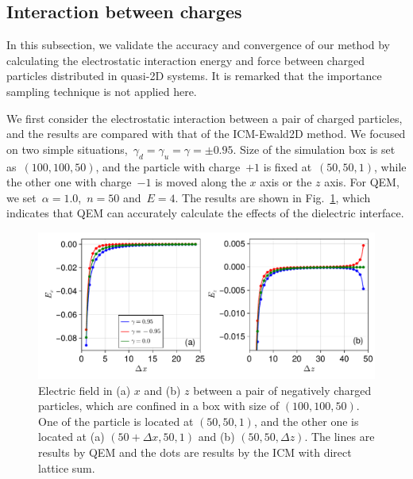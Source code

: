 
\subsection{Interaction between charges}

In this subsection, we validate the accuracy and convergence of our method by calculating the electrostatic interaction energy and force between charged particles distributed in quasi-2D systems.
It is remarked that the importance sampling technique is not applied here.

We first consider the electrostatic interaction between a pair of charged particles, and the results are compared with that of the ICM-Ewald2D method.
We focused on two simple situations,~$\gamma_{d} = \gamma_{u} = \gamma = \pm 0.95$.
Size of the simulation box is set as~$(100, 100, 50)$, and the particle with charge~$+1$ is fixed at~$(50, 50, 1)$, while the other one with charge~$-1$ is moved along the $x$ axis or the $z$ axis.
For QEM, we set~$\alpha = 1.0$,~$n = 50$ and~$E = 4$.
The results are shown in Fig.~\ref{fig:E_xyz}, which indicates that QEM can accurately calculate the effects of the dielectric interface.

\begin{figure}[htb]
    \centering
    \includegraphics[width = \linewidth]{figs/E_xyz.pdf}
    \caption{
        Electric field in (a) $x$ and (b) $z$ between a pair of negatively charged particles, which are confined in a box with size of $(100, 100, 50)$.
        One of the particle is located at $(50, 50, 1)$, and the other one is located at (a) $(50 + \Delta x, 50, 1)$ and (b) $(50, 50, \Delta z)$.
        The lines are results by QEM and the dots are results by the ICM with direct lattice sum.
    }
    \label{fig:E_xyz}
\end{figure}

